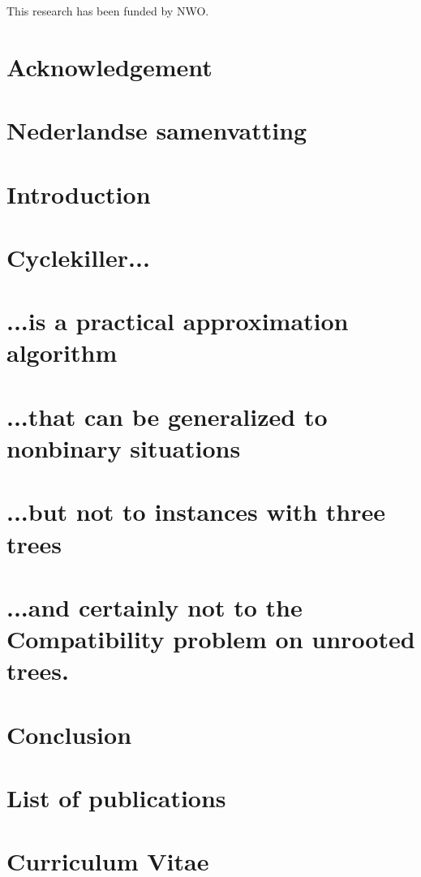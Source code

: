 \documentclass{report}
\begin{document}
\vspace{8cm}

This research has been funded by NWO.

\restoregeometry



\chapter*{Acknowledgement}

\chapter*{Nederlandse samenvatting}

\tableofcontents

\chapter{Introduction} \label{ch:intro}


\chapter{Cyclekiller...}\label{ch:1}


\chapter{...is a practical approximation algorithm} \label{ch:2}


\chapter{...that can be generalized to nonbinary situations}\label{ch:3}


\chapter{...but not to instances with three trees}\label{ch:4}


\chapter{...and certainly not to the Compatibility problem on unrooted trees.}\label{ch:5}


\chapter{Conclusion}








\chapter*{List of publications}



\chapter*{Curriculum Vitae}

\end{document}
